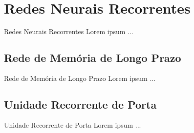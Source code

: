 \section{Redes Neurais Recorrentes}
\label{s.rnn}

\begin{frame}{Redes Neurais Recorrentes}
	Lorem ipsum ...
\end{frame}

\subsection{Rede de Memória de Longo Prazo}
\label{ss.lstm}

\begin{frame}{Rede de Memória de Longo Prazo}
	Lorem ipsum ...
\end{frame}

\subsection{Unidade Recorrente de Porta}
\label{ss.gru}

\begin{frame}{Unidade Recorrente de Porta}
	Lorem ipsum ...
\end{frame}